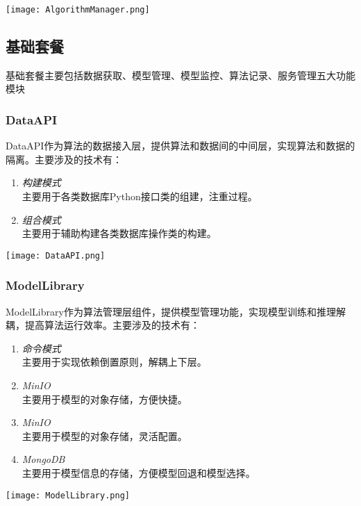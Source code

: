 \documentclass[cn,hazy,blue,14pt,screen]{elegantnote}
\begin{document}
\centerline{
	\texttt{[image: AlgorithmManager.png]}
}



\subsection{基础套餐}

基础套餐主要包括数据获取、模型管理、模型监控、算法记录、服务管理五大功能模块



\subsubsection{DataAPI}

DataAPI作为算法的数据接入层，提供算法和数据间的中间层，实现算法和数据的隔离。主要涉及的技术有：
\begin{enumerate}[label=\arabic*).]
	\item \textit{构建模式}\\
	主要用于各类数据库Python接口类的组建，注重过程。
	\item \textit{组合模式}\\
	主要用于辅助构建各类数据库操作类的构建。
\end{enumerate}

\centerline{
	\texttt{[image: DataAPI.png]}
}




\subsubsection{ModelLibrary}

ModelLibrary作为算法管理层组件，提供模型管理功能，实现模型训练和推理解耦，提高算法运行效率。主要涉及的技术有：
\begin{enumerate}[label=\arabic*).]
	\item \textit{命令模式}\\
	主要用于实现依赖倒置原则，解耦上下层。
	\item \textit{MinIO}\\
	主要用于模型的对象存储，方便快捷。
	\item \textit{MinIO}\\
	主要用于模型的对象存储，灵活配置。
	\item \textit{MongoDB}\\
	主要用于模型信息的存储，方便模型回退和模型选择。	
\end{enumerate}

\centerline{
	\texttt{[image: ModelLibrary.png]}
}
\end{document}
